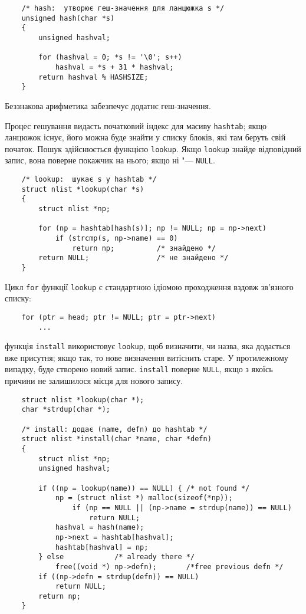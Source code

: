 \documentclass[a4paper,12pt]{book}
\begin{document}
  \begin{verbatim}
    /* hash:  утворює геш-значення для ланцюжка s */
    unsigned hash(char *s)
    {
        unsigned hashval;

        for (hashval = 0; *s != '\0'; s++)
            hashval = *s + 31 * hashval;
        return hashval % HASHSIZE;
    }
  \end{verbatim}

  Беззнакова арифметика забезпечує додатнє геш-значення.

  Процес гешування видасть початковий індекс для масиву \texttt{hashtab}; якщо ланцюжок
  існує, його можна буде знайти у списку блоків, які там беруть свій початок. Пошук
  здійснюється функцією \texttt{lookup}. Якщо \texttt{lookup} знайде відповідний запис,
  вона поверне покажчик на нього; якщо ні "--- \texttt{NULL}.

  \begin{verbatim}
    /* lookup:  шукає s у hashtab */
    struct nlist *lookup(char *s)
    {
        struct nlist *np;

        for (np = hashtab[hash(s)]; np != NULL; np = np->next)
            if (strcmp(s, np->name) == 0)
                return np;          /* знайдено */
        return NULL;                /* не знайдено */
    }
  \end{verbatim}

  Цикл \texttt{for} функції \texttt{lookup} є стандартною ідіомою проходження вздовж
  зв'язного списку:
  \begin{verbatim}
    for (ptr = head; ptr != NULL; ptr = ptr->next)
        ...
  \end{verbatim}
  функція \texttt{install} використовує \texttt{lookup}, щоб визначити, чи назва, яка
  додається вже присутня; якщо так, то нове визначення витіснить старе. У протилежному
  випадку, буде створено новий запис. \texttt{install} поверне \texttt{NULL}, якщо з
  якоїсь причини не залишилося місця для нового запису.

  \begin{verbatim}
    struct nlist *lookup(char *);
    char *strdup(char *);

    /* install: додає (name, defn) до hashtab */
    struct nlist *install(char *name, char *defn)
    {
        struct nlist *np;
        unsigned hashval;

        if ((np = lookup(name)) == NULL) { /* not found */
            np = (struct nlist *) malloc(sizeof(*np));
                if (np == NULL || (np->name = strdup(name)) == NULL)
                    return NULL;
            hashval = hash(name);
            np->next = hashtab[hashval];
            hashtab[hashval] = np;
        } else            /* already there */
            free((void *) np->defn);       /*free previous defn */
        if ((np->defn = strdup(defn)) == NULL)
            return NULL;
        return np;
    }
  \end{verbatim}
\end{document}
